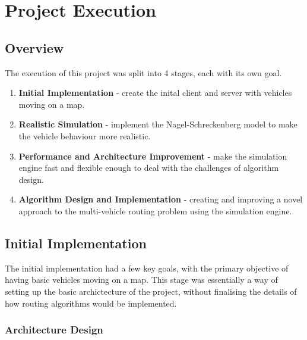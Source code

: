 \documentclass[ %
                    author={Alexander Hill},
                supervisor={Dr. Benjamin Sach},
                    degree={MEng},
                     title={MARMOSET},
                  subtitle={Multi-Agent Route Management using Online Simulation for Efficient Transportation},
                      type={research},
                      year={2016} ]{dissertation}
\begin{document}

\chapter{Project Execution}
\label{chap:execution}


\section{Overview}

The execution of this project was split into 4 stages, each with its own goal.

\begin{enumerate}
    \item \textbf{Initial Implementation} - create the inital client and
        server with vehicles moving on a map.
    \item \textbf{Realistic Simulation} - implement the Nagel-Schreckenberg
        model to make the vehicle behaviour more realistic.
    \item \textbf{Performance and Architecture Improvement} - make the
        simulation engine fast and flexible enough to deal with the challenges
        of algorithm design.
    \item \textbf{Algorithm Design and Implementation} - creating and improving
        a novel approach to the multi-vehicle routing problem using the
        simulation engine.
\end{enumerate}

\section{Initial Implementation}

The initial implementation had a few key goals, with the primary objective of
having basic vehicles moving on a map. This stage was essentially a way of
setting up the basic archictecture of the project, without finalising the
details of how routing algorithms would be implemented.

\subsection{Architecture Design}
\end{document}
